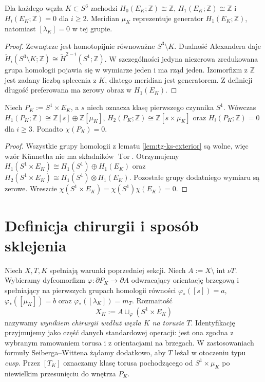 \begin{lemat}
\label{lem:tg-ks-exterior}
Dla każdego węzła $K\subset S^3$ zachodzi
$H_0(E_K;\mathbb Z)\cong\mathbb Z$,
$H_1(E_K;\mathbb Z)\cong\mathbb Z$ i
$H_i(E_K;\mathbb Z)=0$ dla $i\ge2$.
Meridian $\mu_K$ reprezentuje generator $H_1(E_K;\mathbb Z)$,
natomiast $[\lambda_K]=0$ w tej grupie.
\end{lemat}

\begin{proof}
Zewnętrze jest homotopijnie równoważne $S^3\setminus K$.
Dualność Alexandera daje
$\widetilde H_i(S^3\setminus K;\mathbb Z)
\cong\widetilde H^{2-i}(S^1;\mathbb Z)$.
W szczególności jedyna niezerowa zredukowana grupa
homologii pojawia się w wymiarze jeden i ma rząd jeden.
Izomorfizm z $\mathbb Z$ jest zadany liczbą splecenia
z $K$, dlatego meridian jest generatorem. Z definicji
długość preferowana ma zerowy obraz w $H_1(E_K)$.
\end{proof}

\begin{wniosek}
\label{cor:tg-ks-piece}
Niech $P_K:=S^1\times E_K$, a $s$ niech oznacza
klasę pierwszego czynnika $S^1$. Wówczas
$H_1(P_K;\mathbb Z)\cong\mathbb Z[s]\oplus\mathbb Z[\mu_K]$,
$H_2(P_K;\mathbb Z)\cong\mathbb Z[s\times\mu_K]$
oraz $H_i(P_K;\mathbb Z)=0$ dla $i\ge3$.
Ponadto $\chi(P_K)=0$.
\end{wniosek}

\begin{proof}
Wszystkie grupy homologii z lematu
\ref{lem:tg-ks-exterior} są wolne, więc wzór Künnetha
nie ma składników $\operatorname{Tor}$. Otrzymujemy
$H_1(S^1\times E_K)\cong H_1(S^1)\oplus H_1(E_K)$
oraz $H_2(S^1\times E_K)\cong H_1(S^1)\otimes H_1(E_K)$.
Pozostałe grupy dodatniego wymiaru są zerowe.
Wreszcie $\chi(S^1\times E_K)=\chi(S^1)\chi(E_K)=0$.
\end{proof}

\section{Definicja chirurgii i sposób sklejenia}
\label{sec:tg-ks-glue}

\begin{definicja}
\label{def:tg-ks-operation}
Niech $X,T,K$ spełniają warunki poprzedniej sekcji.
Niech $A:=X\setminus\operatorname{int}\nu T$.
Wybieramy dyfeomorfizm $\varphi:\partial P_K\to\partial A$
odwracający orientację brzegową i spełniający na
pierwszych grupach homologii równości
$\varphi_*([s])=a$, $\varphi_*([\mu_K])=b$
oraz $\varphi_*([\lambda_K])=m_T$.
Rozmaitość
\[
X_K:=A\cup_\varphi(S^1\times E_K)
\]
nazywamy \emph{wynikiem chirurgii wzdłuż węzła $K$ na torusie $T$}.
Identyfikację przyjmujemy jako część danych standardowej
operacji: jest ona zgodna z wybranym ramowaniem torusa
i z orientacjami na brzegach. W zastosowaniach
formuły Seiberga--Wittena żądamy dodatkowo, aby $T$
leżał w otoczeniu typu \emph{cusp}. Przez $[T_K]$
oznaczamy klasę torusa pochodzącego od
$S^1\times\mu_K$ po niewielkim przesunięciu do wnętrza $P_K$.
\end{definicja}

